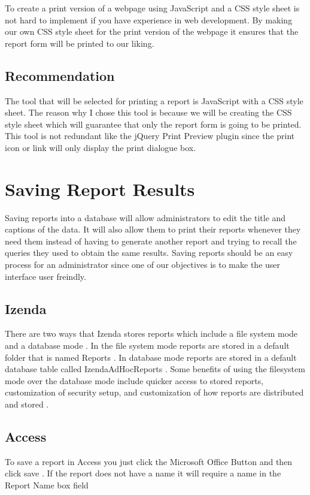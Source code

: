 \documentclass[letterpaper,10pt,serif, draftclsnofoot,onecolumn, compsoc, titlepage]{IEEEtran}
\begin{document}
To create a print version of a webpage using JavaScript and a CSS style sheet is not hard to implement if you have experience in web development. By making our own CSS style sheet for the print version of the webpage it ensures that the report form will be printed to our liking. 

\subsection{Recommendation} 
The tool that will be selected for printing a report is JavaScript with a CSS style sheet. The reason why I chose this tool is because we will be creating the CSS style sheet which will guarantee that only the report form is going to be printed. This tool is not redundant like the jQuery Print Preview plugin since the print icon or link will only display the print dialogue box. 

\section{Saving Report Results}
Saving reports into a database will allow administrators to edit the title and captions of the data. It will also allow them to print their reports whenever they need them instead of having to generate another report and trying to recall the queries they used to obtain the same results. Saving reports should be an easy process for an administrator since one of our objectives is to make the user interface user freindly. 

\subsection{Izenda}
There are two ways that Izenda stores reports which include a file system mode and a database mode \cite{Adams}. In the file system mode reports are stored in a default folder that is named Reports \cite{Adams}. In database mode reports are stored in a default database table called IzendaAdHocReports \cite{Adams}. Some benefits of using the filesystem mode over the database mode include quicker access to stored reports, customization of security setup, and customization of how reports are distributed and stored \cite{Adams}. 

\subsection{Access}
To save a report in Access you just click the Microsoft Office Button and then click save \cite{SimpleReport}. If the report does not have a name it will require a name in the Report Name box field \cite{SimpleReport}
\end{document}

